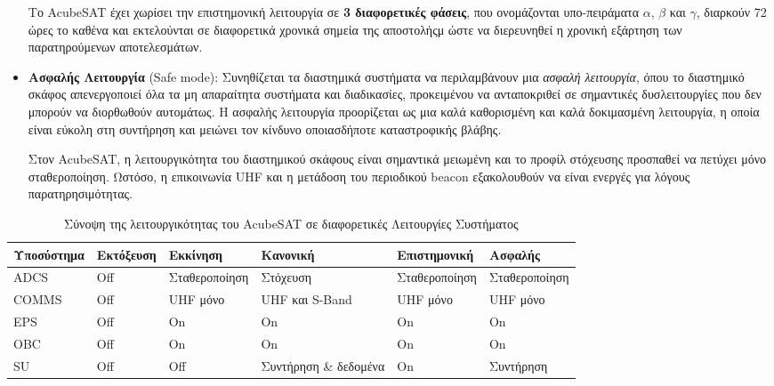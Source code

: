 \documentclass[a4paper,nobib]{tufte-book}
\begin{document}
\begin{itemize}
	Το AcubeSAT έχει χωρίσει την επιστημονική λειτουργία σε \textbf{3 διαφορετικές φάσεις}, που ονομάζονται υπο-πειράματα \(\alpha\), \(\beta\) και \(\gamma\), διαρκούν 72 ώρες το καθένα και εκτελούνται σε διαφορετικά χρονικά σημεία της αποστολήςμ ώστε να διερευνηθεί η χρονική εξάρτηση των παρατηρούμενων αποτελεσμάτων.
	
	\item \textbf{Ασφαλής Λειτουργία} (Safe mode): Συνηθίζεται τα διαστημικά συστήματα να περιλαμβάνουν μια \emph{ασφαλή λειτουργία},\autocite[385]{aguirre_introduction_space_2013} όπου το διαστημικό σκάφος απενεργοποιεί όλα τα μη απαραίτητα συστήματα και διαδικασίες, προκειμένου να ανταποκριθεί σε σημαντικές δυσλειτουργίες που δεν μπορούν να διορθωθούν αυτομάτως. Η ασφαλής λειτουργία προορίζεται ως μια καλά καθορισμένη και καλά δοκιμασμένη λειτουργία, η οποία είναι εύκολη στη συντήρηση και μειώνει τον κίνδυνο οποιασδήποτε καταστροφικής βλάβης.
	
	Στον AcubeSAT, η λειτουργικότητα του διαστημικού σκάφους είναι σημαντικά μειωμένη και το προφίλ στόχευσης προσπαθεί να πετύχει μόνο σταθεροποίηση. Ωστόσο, η επικοινωνία \ac{UHF} και η μετάδοση του περιοδικού beacon εξακολουθούν να είναι ενεργές για λόγους παρατηρησιμότητας.
\end{itemize}

\begin{table}[h]
	\centering
	\caption{Σύνοψη της λειτουργικότητας του AcubeSAT σε διαφορετικές Λειτουργίες Συστήματος}
	\label{tab:acubesatmodes}
	\begin{tabular}{@{}llllll@{}}
		\toprule
		Υποσύστημα    & Εκτόξευση & Εκκίνηση & Κανονική                 & Επιστημονική        & Ασφαλής             \\ \midrule
		\acs{ADCS}  & \color{off} Off    & Σταθεροποίηση     & \color{on} Στόχευση                & Σταθεροποίηση     & Σταθεροποίηση       \\
		\acs{COMMS} & \color{off} Off    & \acs{UHF} μόνο & \color{on} \acs{UHF} και S-Band    & \acs{UHF} μόνο & \acs{UHF} μόνο   \\
		\acs{EPS}   & \color{off} Off    & \color{on} On             & \color{on} On                      & \color{on} On             & \color{on} On               \\
		\acs{OBC}   & \color{off} Off    & \color{on} On             & \color{on} On                      & \color{on} On             & \color{on} On               \\
		\acs{SU}    & \color{off} Off    & \color{off} Off            & Συντήρηση \& δεδομένα & \color{on} On             & Συντήρηση \\ \bottomrule
	\end{tabular}
	\vspace{1em}
\end{table}
\end{document}
